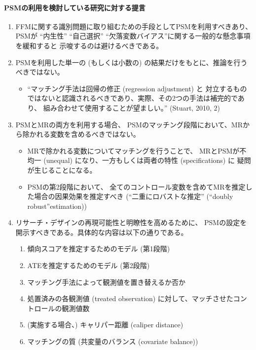 \paragraph{PSMの利用を検討している研究に対する提言}
\begin{enumerate}
 \item FFMに関する識別問題に取り組むための手段としてPSMを利用すべきあり、PSMが
        ``内生性'' ``自己選択'' ``欠落変数バイアス''に関する一般的な懸念事項を緩和すると
       示唆するのは避けるべきである。
 \item PSMを利用した単一の (もしくは小数の) の結果だけをもとに、推論を行うべきではない。
       \begin{itemize}
        \item ``マッチング手法は回帰の修正 (regression adjustment) と
              対立するものではないと認識されるべきであり、実際、その2つの手法は補完的であり、
              組み合わせて使用することが望ましい。'' (Stuart, 2010, 2)
       \end{itemize}
 \item PSMとMRの両方を利用する場合、
       PSMのマッチング段階において、MRから除かれる変数を含めるべきではない。
       \begin{itemize}
        \item MRで除かれる変数についてマッチングを行うことで、
              MRとPSMが不均一 (unequal) になり、一方もしくは両者の特性 (specifications) に
              疑問が生じることになる。
        \item PSMの第2段階において、
              全てのコントロール変数を含めてMRを推定した場合の因果効果を推定すべき (``二重にロバストな推定'' (``doubly robust''estimation))
       \end{itemize}
 \item リサーチ・デザインの再現可能性と明瞭性を高めるために、
       PSMの設定を開示すべきである。具体的な内容は以下の通りである。
       \begin{enumerate}
        \item 傾向スコアを推定するためのモデル (第1段階)
        \item ATEを推定するためのモデル (第2段階)
        \item マッチング手法によって観測値を置き替えるか否か
        \item 処置済みの各観測値 (treated observation) に対して、マッチさせたコントロールの観測値数
        \item (実施する場合、) キャリパー距離 (caliper distance)
        \item マッチングの質 (共変量のバランス (covariate balance))
       \end{enumerate}
\end{enumerate}

